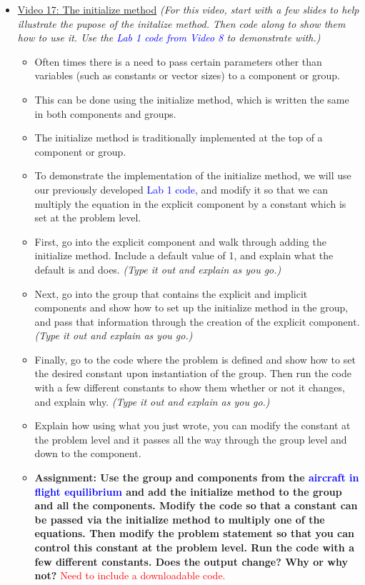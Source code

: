 \documentclass[12pt, letterpaper]{article}
\begin{document}
\begin{itemize}
	\item \underline{Video 17: The initialize method} \textit{(For this video, start with a few slides to help illustrate the pupose of the initalize method. Then code along to show them how to use it. Use the \textcolor{blue}{Lab 1 code from Video 8} to demonstrate with.)}
		\begin{itemize}
			\item Often times there is a need to pass certain parameters other than variables (such as constants or vector sizes) to a component or group.
			\item This can be done using the initialize method, which is written the same in both components and groups.
			\item The initialize method is traditionally implemented at the top of a component or group.
			\item To demonstrate the implementation of the initialize method, we will use our previously developed \textcolor{blue}{Lab 1 code}, and modify it so that we can multiply the equation in the explicit component by a constant which is set at the problem level. 
			\item First, go into the explicit component and walk through adding the initialize method. Include a default value of 1, and explain what the default is and does. \textit{(Type it out and explain as you go.)}
			\item Next, go into the group that contains the explicit and implicit components and show how to set up the initialize method in the group, and pass that information through the creation of the explicit component. \textit{(Type it out and explain as you go.)}
			\item Finally, go to the code where the problem is defined and show how to set the desired constant upon instantiation of the group. Then run the code with a few different constants to show them whether or not it changes, and explain why. \textit{(Type it out and explain as you go.)}
			\item Explain how using what you just wrote, you can modify the constant at the problem level and it passes all the way through the group level and down to the component.
			\item \textbf{Assignment: Use the group and components from the \textcolor{blue}{aircraft in flight equilibrium} and add the initialize method to the group and all the components. Modify the code so that a constant can be passed via the initialize method to multiply one of the equations. Then modify the problem statement so that you can control this constant at the problem level. Run the code with a few different constants. Does the output change? Why or why not?} \textcolor{red}{Need to include a downloadable code.}
		\end{itemize}
		

\end{itemize}
\end{document}
